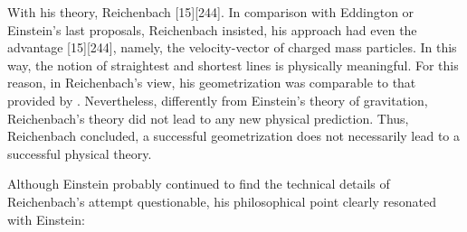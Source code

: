 \documentclass[final]{article}
\begin{document}
With his theory, Reichenbach  [15][244]. In comparison with Eddington or Einstein's last proposals, Reichenbach insisted, his approach had even the advantage  [15][244], namely, the velocity-vector of charged mass particles. In this way, the notion of straightest and shortest lines is physically meaningful. For this reason, in Reichenbach's view, his geometrization was comparable to that provided by \gr. Nevertheless, differently from Einstein's theory of gravitation, Reichenbach's theory did not lead to any new physical prediction. Thus, Reichenbach concluded, a successful geometrization does not necessarily lead to a successful physical theory. 

Although Einstein probably continued to find the technical details of Reichenbach's attempt questionable, his philosophical point clearly resonated with Einstein:
\end{document}

